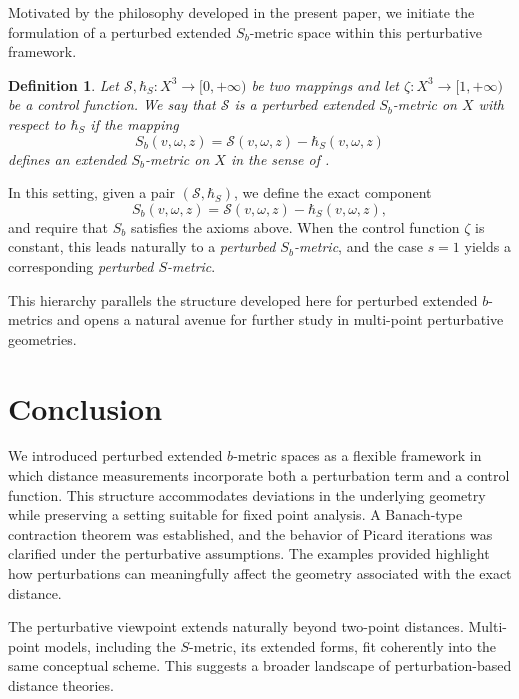 \documentclass[sn-mathphys-num]{sn-jnl}%
\theoremstyle{thmstyleone}%
\theoremstyle{thmstyletwo}%
\theoremstyle{thmstylethree}%
\newtheorem{definition}{Definition}
\numberwithin{equation}{section}
\begin{document}
Motivated by the philosophy developed in the present paper, we initiate 
the formulation of a perturbed extended $S_{b}$-metric space within this 
perturbative framework. 

\begin{definition}
Let $\mathcal{S},\hbar_{S}:X^{3}\to[0,+\infty)$ be two mappings and let 
$\zeta:X^{3}\to[1,+\infty)$ be a control function.  
We say that $\mathcal{S}$ is a \emph{perturbed extended $S_{b}$-metric} on $X$
with respect to $\hbar_{S}$ if the mapping
\[
S_{b}(v,\omega,z)
    = \mathcal{S}(v,\omega,z) - \hbar_{S}(v,\omega,z)
\]
defines an extended $S_{b}$-metric on $X$ in the sense of \cite{Mlaiki}.
\end{definition}

In this setting, given a pair $(\mathcal{S},\hbar_{S})$, we define the 
exact component
\[
S_{b}(v,\omega,z)
    = \mathcal{S}(v,\omega,z)
    - \hbar_{S}(v,\omega,z),
\]
and require that $S_{b}$ satisfies the axioms above. When the control function 
$\zeta$ is constant, this leads naturally to a \emph{perturbed $S_{b}$-metric}, 
and the case $s=1$ yields a corresponding \emph{perturbed $S$-metric}.

This hierarchy parallels the structure developed here for perturbed extended 
$b$-metrics and opens a natural avenue for further study in multi-point 
perturbative geometries.





\section*{Conclusion}

We introduced perturbed extended $b$-metric spaces as a flexible framework in 
which distance measurements incorporate both a perturbation term and a control 
function. This structure accommodates deviations in the underlying geometry 
while preserving a setting suitable for fixed point analysis. A Banach-type 
contraction theorem was established, and the behavior of Picard iterations was 
clarified under the perturbative assumptions. The examples provided highlight 
how perturbations can meaningfully affect the geometry associated with the 
exact distance.

The perturbative viewpoint extends naturally beyond two-point distances. 
Multi-point models, including the $S$-metric, its extended forms, fit coherently into the same conceptual scheme. 
This suggests a broader landscape of perturbation-based distance theories.
\end{document}

